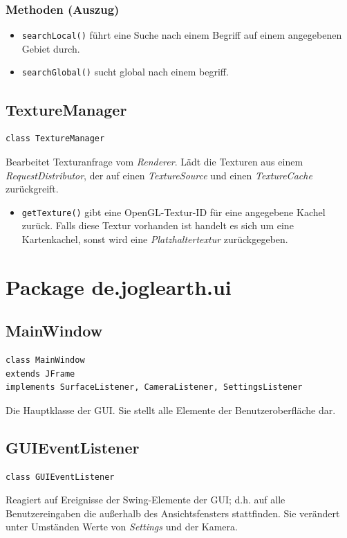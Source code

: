 \documentclass[10pt]{scrreprt}
\begin{document}
\subsubsection*{Methoden (Auszug)}
\begin{itemize}
\item \texttt{searchLocal()} führt eine Suche nach einem Begriff auf einem angegebenen Gebiet durch.
\item \texttt{searchGlobal()} sucht global nach einem begriff.
\end{itemize}

\vspace{5mm}
\subsection*{TextureManager}
\begin{lstlisting}
class TextureManager
\end{lstlisting}
Bearbeitet Texturanfrage vom \textit{Renderer}. Lädt die Texturen aus einem \textit{RequestDistributor}, der auf einen \textit{TextureSource} und einen \textit{TextureCache} zurückgreift.\\
\begin{itemize}
\item\texttt{getTexture()} gibt eine OpenGL-Textur-ID für eine angegebene Kachel zurück. Falls diese Textur vorhanden ist handelt es sich um eine Kartenkachel, sonst wird eine \textit{Platzhaltertextur} zurückgegeben.
\end{itemize}




\vspace{5mm}
\section{Package de.joglearth.ui}
\subsection*{MainWindow}
\begin{lstlisting}
class MainWindow
extends JFrame
implements SurfaceListener, CameraListener, SettingsListener
\end{lstlisting}
Die Hauptklasse der GUI. Sie stellt alle Elemente der Benutzeroberfläche dar.

\vspace{5mm}
\subsection*{GUIEventListener}
\begin{lstlisting}
class GUIEventListener
\end{lstlisting}
Reagiert auf Ereignisse der Swing-Elemente der GUI; d.h. auf alle Benutzereingaben die außerhalb des Ansichtsfensters stattfinden. Sie verändert unter Umständen Werte von \textit{Settings} und der Kamera.\\
\end{document}
